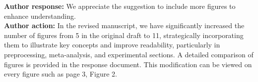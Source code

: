 \documentclass[Afour,sageh,times]{sagej}
\begin{document}
\textbf{Author response:} We appreciate the suggestion to include more figures to enhance understanding.\\
\textbf{Author action:} In the revised manuscript, we have significantly increased the number of figures from 5 in the original draft to 11, strategically incorporating them to illustrate key concepts and improve readability, particularly in preprocessing, meta-analysis, and experimental sections. A detailed comparison of figures is provided in the response document. This modification can be viewed on every figure such as page 3, Figure 2.\\
\end{document}
